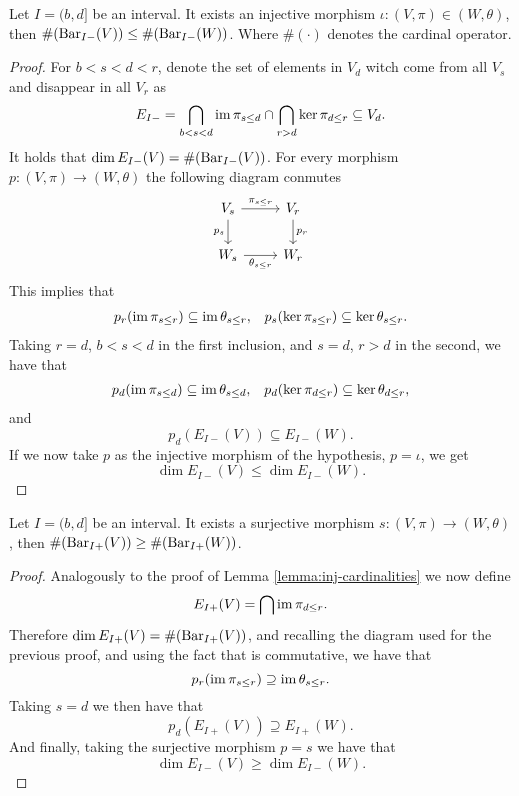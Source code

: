 \begin{lemma} \label{lemma:inj-cardinalities}
    Let $ I = (b, d] $ be an interval. It exists an injective morphism $\iota \colon (V, \pi) \in (W, \theta) $, then $\#(\operatorname{Bar}_{I-}(V)) \leq \#(\operatorname{Bar}_{I-}(W)) $. Where $ \#(\cdot) $ denotes the cardinal operator.
\end{lemma}
\begin{proof}
    For $ b < s < d < r $, denote the set of elements in $ V_d $ witch come from all $ V_s $ and disappear in all $ V_r $ as
    $$
        E_{I-} = \bigcap_{b < s < d} \operatorname{im} \pi_{s\leq d} \cap \bigcap_{r> d} \ker \pi_{d \leq r} \subseteq V_d.
    $$
    It holds that $ \dim E_{I-}(V) = \#(\operatorname{Bar}_{I-}(V)) $. For every morphism $ p\colon (V, \pi) \to (W, \theta) $ the following diagram conmutes
    $$
    \begin{tikzcd}
        V_s \arrow[r, "\pi_{s \leq r}"] \arrow[d, "p_s"'] & V_r \arrow[d, "p_r"] \\
        W_s \arrow[r, "\theta_{s \leq r}"']               & W_r
    \end{tikzcd}
    $$
    This implies that
    \begin{align}
        p_r(\operatorname{im} \pi_{s \leq r}) \subseteq \operatorname{im} \theta_{s \leq r}, & & p_s(\ker \pi_{s \leq r}) \subseteq \ker \theta_{s \leq r}.
    \end{align}
    Taking $ r = d $, $ b < s < d $ in the first inclusion, and $ s = d $, $ r > d $ in the second, we have that
    \begin{align}
        p_d(\operatorname{im} \pi_{s \leq d}) \subseteq \operatorname{im} \theta_{s \leq d}, & & p_d(\ker \pi_{d \leq r}) \subseteq \ker \theta_{d \leq r},
    \end{align}
    and 
    $$
        p_d(E_{I-}(V)) \subseteq E_{I-}(W).
    $$
    If we now take $ p $ as the injective morphism of the hypothesis, $ p = \iota $, we get
    $$
        \dim E_{I-}(V) \leq \dim E_{I-}(W).
    $$
\end{proof}
 
\begin{lemma} \label{lemma:sur-cardinalities}
    Let $ I = (b, d] $ be an interval. It exists a surjective morphism $s\colon (V, \pi) \to (W, \theta) $, then $\#(\operatorname{Bar}_{I+}(V)) \geq \#(\operatorname{Bar}_{I+}(W)) $.
\end{lemma}
\begin{proof}
    Analogously to the proof of Lemma \ref{lemma:inj-cardinalities} we now define
    $$
        E_{I+}(V) = \bigcap \operatorname{im} \pi_{d \leq r}.
    $$
    Therefore $ \dim E_{I+}(V) = \#(\operatorname{Bar}_{I+}(V)) $, and recalling the diagram used for the previous proof, and using the fact that is commutative, we have that
    $$
        p_r(\operatorname{im} \pi_{s \leq r}) \supseteq \operatorname{im} \theta_{s \leq r}.
    $$
    Taking $ s = d $ we then have that
    $$
        p_d(E_{I+}(V)) \supseteq E_{I+}(W).
    $$
    And finally, taking the surjective morphism $ p = s $ we have that
    $$
        \dim E_{I-}(V) \geq \dim E_{I-}(W).
    $$
\end{proof}

